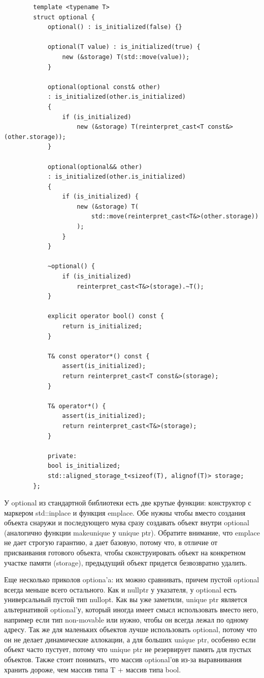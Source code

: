 \documentclass[12pt, a4paper]{article}
\begin{document}
	\begin{verbatim}
		template <typename T>
		struct optional {
			optional() : is_initialized(false) {}
			
			optional(T value) : is_initialized(true) {
				new (&storage) T(std::move(value));
			}
			
			optional(optional const& other)
			: is_initialized(other.is_initialized)
			{
				if (is_initialized)
					new (&storage) T(reinterpret_cast<T const&>(other.storage));
			}
			
			optional(optional&& other)
			: is_initialized(other.is_initialized)
			{
				if (is_initialized) {
					new (&storage) T(
						std::move(reinterpret_cast<T&>(other.storage))
					);
				}
			}
			
			~optional() {
				if (is_initialized)
					reinterpret_cast<T&>(storage).~T();
			}
			
			explicit operator bool() const {
				return is_initialized;
			}
			
			T& const operator*() const {
				assert(is_initialized);
				return reinterpret_cast<T const&>(storage);
			}
			
			T& operator*() {
				assert(is_initialized);
				return reinterpret_cast<T&>(storage);
			}
			
			private:
			bool is_initialized;
			std::aligned_storage_t<sizeof(T), alignof(T)> storage;
		};
	\end{verbatim}
	У optional из стандартной библиотеки есть две крутые функции: конструктор с маркером std::in\textunderscore place и функция emplace. Обе нужны чтобы вместо создания объекта снаружи и последующего мува сразу создавать объект внутри optional (аналогично функции make\textunderscore unique у unique ptr). Обратите внимание, что emplace не дает строгую гарантию, а дает базовую, потому что, в отличие от присваивания готового объекта, чтобы сконструировать объект на конкретном участке памяти (storage), предыдущий объект придется безвозвратно удалить.
	\par Еще несколько приколов optiona'a: их можно сравнивать, причем пустой optional всегда меньше всего остального. Как и nullptr у указателя, у optional есть универсальный пустой тип nullopt. Как вы уже заметили, unique ptr является альтернативой optional'у, который иногда имеет смысл использовать вместо него, например если тип non-movable или нужно, чтобы он всегда лежал по одному адресу. Так же для маленьких объектов лучше использовать optional, потому что он не делает динамические аллокации, а для больших unique ptr, особенно если объект часто пустует, потому что unique ptr не резервирует память для пустых объектов. Также стоит понимать, что массив optional'ов из-за выравнивания хранить дороже, чем массив типа T + массив типа bool.
\end{document}
